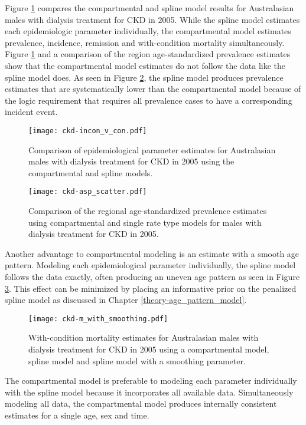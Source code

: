 Figure \ref{fig:app-CKD incon v con} compares the compartmental and
spline model results for Australasian males with dialysis
treatment for CKD in 2005.  While the spline model estimates each
epidemiologic parameter individually, the compartmental model estimates
prevalence, incidence, remission and with-condition mortality
simultaneously.  Figure \ref{fig:app-CKD incon v con} and a 
comparison of the region age-standardized prevalence estimates 
show that the compartmental model estimates do not follow the data 
like the spline model does.  As seen in Figure \ref{fig:app-CKD asp}, the 
spline model produces prevalence estimates that are systematically lower
than the compartmental model because of the logic requirement that
requires all prevalence cases to have a corresponding incident event.

    \begin{figure}[h]
        \begin{center}
            \texttt{[image: ckd-incon\_v\_con.pdf]}
            \caption{Comparison of epidemiological parameter estimates
              for Australasian males with dialysis treatment for CKD
              in 2005 using the compartmental and spline
              models.}
            \label{fig:app-CKD incon v con}
        \end{center}
    \end{figure}

    \begin{figure}[h]
        \begin{center}
            \texttt{[image: ckd-asp\_scatter.pdf]}
            \caption{Comparison of the regional age-standardized
              prevalence estimates using compartmental and single rate
              type models for males with dialysis treatment for CKD in
              2005.}
            \label{fig:app-CKD asp}
        \end{center}
    \end{figure}

Another advantage to compartmental modeling is an estimate with a smooth
age pattern. Modeling each epidemiological parameter individually, the
spline model follows the data exactly, often producing an
uneven age pattern as seen in Figure \ref{fig:app-CKD smooth}.  This
effect can be minimized by placing an informative prior on the
penalized spline model as discussed in Chapter
\ref{theory-age_pattern_model}.

    \begin{figure}[h]
        \begin{center}
            \texttt{[image: ckd-m\_with\_smoothing.pdf]}
            \caption{With-condition mortality estimates for
              Australasian males with dialysis treatment for CKD in
              2005 using a compartmental model, spline model
              and spline model with a smoothing parameter.}
            \label{fig:app-CKD smooth}
        \end{center}
    \end{figure}

The compartmental model is preferable to modeling each parameter 
individually with the spline model because it incorporates all 
available data.  Simultaneously modeling all data, the compartmental 
model produces internally consistent estimates for a single age, 
sex and time.
